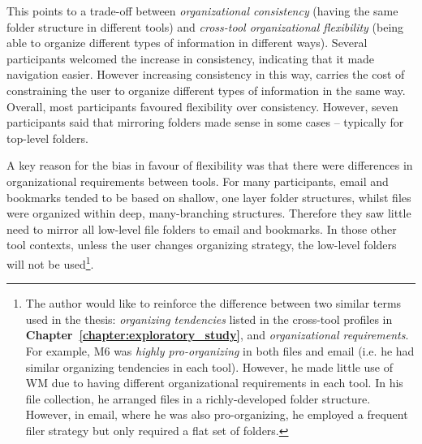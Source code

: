 This points to a trade-off between \textit{organizational consistency} (having the same folder structure in different tools) and \textit{cross-tool organizational flexibility} (being able to organize different types of information in different ways). Several participants welcomed the increase in consistency, indicating that it made navigation easier.  However increasing consistency in this way, carries the cost of constraining the user to organize different types of information in the same way.
Overall, most participants favoured flexibility over consistency.  However, seven participants said that mirroring folders made sense in some cases -- typically for top-level folders.  %

A key reason for the bias in favour of flexibility was that there were differences in organizational requirements between tools. For many participants, email and bookmarks tended to be based on shallow, one layer folder structures, whilst files were organized within deep, many-branching structures.  Therefore they saw little need to mirror all low-level file folders to email and bookmarks.  In those other tool contexts, unless the user changes organizing strategy, the low-level folders will not be used\footnote{The author would like to reinforce the difference between two similar terms used in the thesis: \textit{organizing tendencies} listed in the cross-tool profiles in \textbf{Chapter~\ref{chapter:exploratory_study}}, and \textit{organizational requirements}.  For example, M6 was \textit{highly pro-organizing} in both files and email (i.e. he had similar organizing tendencies in each tool).  However, he made little use of WM due to having different organizational requirements in each tool.  In his file collection, he arranged files in a richly-developed folder structure.  However, in email, where he was also pro-organizing, he employed a frequent filer strategy but only required a flat set of folders.}.

